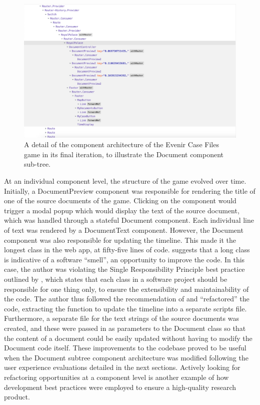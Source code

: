 \documentclass{l4proj}
\begin{document}
\begin{figure}[!htb]
    \centering
    \includegraphics[scale=0.4]{images/Architecture_2.png}
    \caption{A detail of the component architecture of the Evenir Case Files game in its final iteration, to illustrate the Document component sub-tree.}
    \label{fig:Architecture_2}
\end{figure}

At an individual component level, the structure of the game evolved over time. Initially, a DocumentPreview component was responsible for rendering the title of one of the source documents of the game. Clicking on the component would trigger a modal popup which would display the text of the source document, which was handled through a stateful Document component. Each individual line of text was rendered by a DocumentText component. However, the Document component was also responsible for updating the timeline. This made it the longest class in the web app, at fifty-five lines of code. \citet{fowler2018refactoring} suggests that a long class is indicative of a software “smell”, an opportunity to improve the code. In this case, the author was violating the Single Responsibility Principle best practice outlined by \citet{martin2002principles}, which states that each class in a software project should be responsible for one thing only, to ensure the extensibility and maintainability of the code. The author thus followed the recommendation of \citet{fowler2018refactoring} and “refactored” the code, extracting the function to update the timeline into a separate scripts file. Furthermore, a separate file for the text strings of the source documents was created, and these were passed in as parameters to the Document class so that the content of a document could be easily updated without having to modify the Document code itself. These improvements to the codebase proved to be useful when the Document subtree component architecture was modified following the user experience evaluations detailed in the next sections. Actively looking for refactoring opportunities at a component level is another example of how development best practices were employed to ensure a high-quality research product. 
\end{document}
